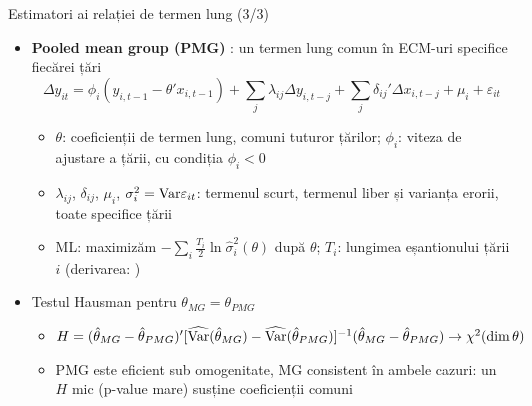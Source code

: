 \begin{frame}{Estimatori ai relației de termen lung (3/3)}
\itemsize{\small}
\begin{itemize}
    \item \textbf{Pooled mean group (PMG)} : un termen lung comun în ECM-uri specifice fiecărei țări \[ \Delta y_{it} = \phi_i(y_{i,t-1} - \theta'x_{i,t-1}) + \sum_j\lambda_{ij}\Delta y_{i,t-j} + \sum_j\delta_{ij}'\Delta x_{i,t-j} + \mu_i + \varepsilon_{it} \]
    \begin{itemize}
        \item $\theta$: coeficienții de termen lung, comuni tuturor țărilor; $\phi_i$: viteza de ajustare a țării, cu condiția $\phi_i < 0$
        \item $\lambda_{ij}$, $\delta_{ij}$, $\mu_i$, $\sigma_i^2 = \text{Var}\varepsilon_{it}$: termenul scurt, termenul liber și varianța erorii, toate specifice țării
        \item ML: maximizăm $-\sum_i\tfrac{T_i}{2}\ln\hat\sigma_i^2(\theta)$ după $\theta$; $T_i$: lungimea eșantionului țării $i$ (derivarea: )  %
    \end{itemize}
    \item Testul Hausman pentru $\theta_{MG} = \theta_{PMG}$
    \begin{itemize}
        \item $H = (\hat\theta_{MG} - \hat\theta_{PMG})'[\widehat{\text{Var}}(\hat\theta_{MG}) - \widehat{\text{Var}}(\hat\theta_{PMG})]^{-1}(\hat\theta_{MG} - \hat\theta_{PMG}) \to \chi^2(\dim\theta)$
        \item PMG este eficient sub omogenitate, MG consistent în ambele cazuri: un $H$ mic (p-value mare) susține coeficienții comuni
    \end{itemize}
\end{itemize}
\end{frame}

